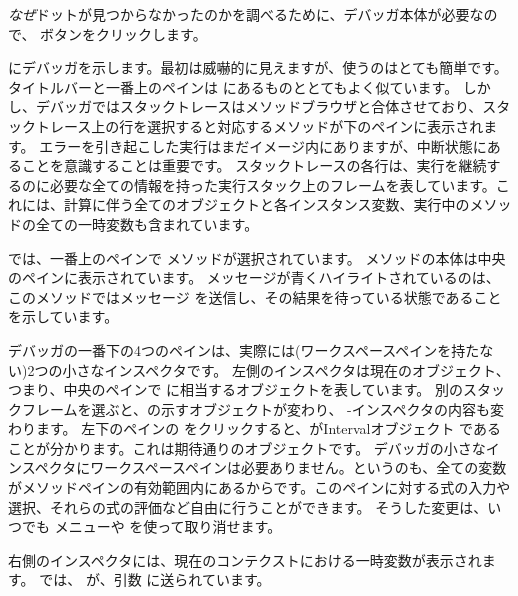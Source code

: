 \documentclass[a4paper,10pt,twoside]{book}
\begin{document}
\emph{なぜ}ドットが見つからなかったのかを調べるために、デバッガ本体が必要なので、 ボタンをクリックします。


 にデバッガを示します。最初は威嚇的に見えますが、使うのはとても簡単です。
タイトルバーと一番上のペインは  にあるものととてもよく似ています。
しかし、デバッガではスタックトレースはメソッドブラウザと合体させており、スタックトレース上の行を選択すると対応するメソッドが下のペインに表示されます。
エラーを引き起こした実行はまだイメージ内にありますが、中断状態にあることを意識することは重要です。
スタックトレースの各行は、実行を継続するのに必要な全ての情報を持った実行スタック上のフレームを表しています。これには、計算に伴う全てのオブジェクトと各インスタンス変数、実行中のメソッドの全ての一時変数も含まれています。

 では、一番上のペインで  メソッドが選択されています。
メソッドの本体は中央のペインに表示されています。 メッセージが青くハイライトされているのは、このメソッドではメッセージ  を送信し、その結果を待っている状態であることを示しています。

デバッガの一番下の4つのペインは、実際には(ワークスペースペインを持たない)2つの小さなインスペクタです。
左側のインスペクタは現在のオブジェクト、つまり、中央のペインで \self に相当するオブジェクトを表しています。
別のスタックフレームを選ぶと、\self の示すオブジェクトが変わり、
\self{}-インスペクタの内容も変わります。
左下のペインの \self をクリックすると、\self がIntervalオブジェクト  であることが分かります。これは期待通りのオブジェクトです。
デバッガの小さなインスペクタにワークスペースペインは必要ありません。というのも、全ての変数がメソッドペインの有効範囲内にあるからです。このペインに対する式の入力や選択、それらの式の評価など自由に行うことができます。
そうした変更は、いつでも  メニューや  を使って取り消せます。

右側のインスペクタには、現在のコンテクストにおける一時変数が表示されます。
 では、
 が、引数  に送られています。

\end{document}
